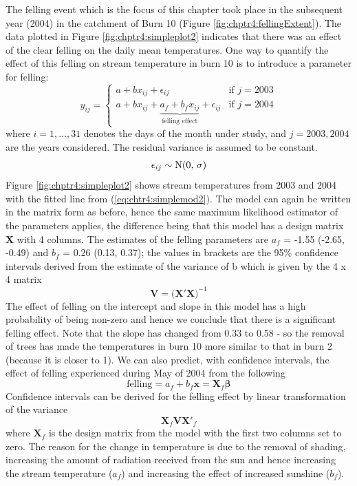 The felling event which is the focus of this chapter took place in the subsequent year (2004) in the catchment of Burn 10 (Figure \ref{fig:chptr4:fellingExtent}). The data plotted in Figure \ref{fig:chptr4:simpleplot2} indicates that there was an effect of the clear felling on the daily mean temperatures. One way to quantify the effect of this felling on stream temperature in burn 10 is to introduce a parameter for felling: 
\begin{equation}
 \label{eq:chtr4:simplemod2}
 y_{ij} =
  \begin{cases}
   a + b x_{ij} + \epsilon_{ij}                    & \text{if } j = 2003 \\
   a + b x_{ij} + \underbrace{a_f + b_f x_{ij}}_\text{felling effect} + \epsilon_{ij} & \text{if } j = 2004 
  \end{cases}
\end{equation}
where $i=1, \ldots, 31$ denotes the days of the month under study, and $j = 2003, 2004$ are the years considered.  The residual variance is assumed to be constant.
\begin{equation}
  \epsilon_{ij} \sim \operatorname{N}(0,\, \sigma)
\end{equation}
Figure \ref{fig:chptr4:simpleplot2} shows stream temperatures from 2003 and 2004 with the fitted line from (\ref{eq:chtr4:simplemod2}). The model can again be written in the matrix form as before, hence the same maximum likelihood estimator of the parameters applies, the difference being that this model has a design matrix $\bm{X}$ with 4 columns. The estimates of the felling parameters are $a_f$ = -1.55 (-2.65, -0.49) and $b_f$ = 0.26 (0.13, 0.37); the values in brackets are the 95\% confidence intervals derived from the estimate of the variance of b which is given by the 4 x 4 matrix
\begin{equation}
  \bm{V} = \Big(\bm{X}'\bm{X}\Big)^{-1}
\end{equation}
The effect of felling on the intercept and slope in this model has a high probability of being non-zero and hence we conclude that there is a significant felling effect. Note that the slope has changed from 0.33 to 0.58 - so the  removal of trees has made the temperatures in burn 10 more similar to that in burn 2 (because it is closer to 1).  We can also predict, with confidence intervals, the effect of felling experienced during May of 2004 from the following
\begin{equation}
  \text{felling} = a_f + b_f \bm{x} = \bm{X}_f \bm{\beta}
\end{equation}
Confidence intervals can be derived for the felling effect by linear transformation of the variance
\begin{equation}
  \bm{X}_f \bm{V} \bm{X}'_f
\end{equation}
where $\bm{X}_f$ is the design matrix from the model with the first two columns set to zero.  
The reason for the change in temperature is due to the removal of shading, increasing the amount of radiation received from the sun and hence increasing the stream temperature ($a_f$) and increasing the effect of increased sunshine ($b_f$).

